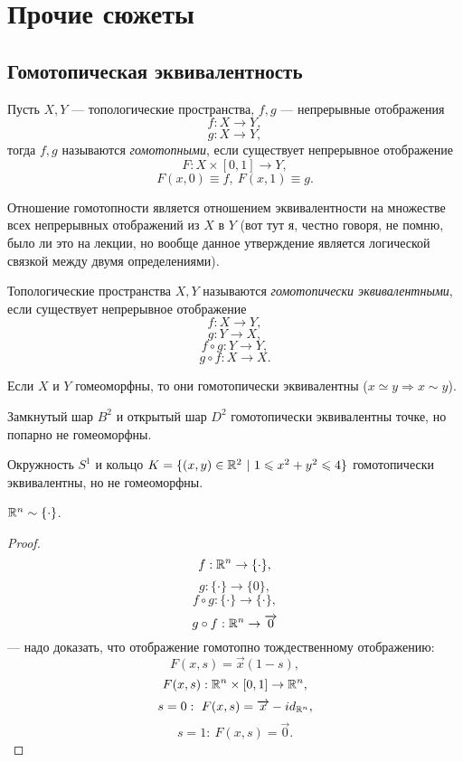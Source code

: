 \newpage
\section{Прочие сюжеты}
\subsection{Гомотопическая эквивалентность}
\begin{definition}
    Пусть $X,Y$ — топологические пространства, $f,g$ — непрерывные отображения
    \[f: X \to Y,\]
    \[g: X \to Y,\]
    тогда $f,g$ называются \textit{гомотопными}, если существует непрерывное отображение 
    \[F: X \times [0,1] \to Y,\]
    \[F(x,0) \equiv f, \ F(x,1) \equiv g.\]
\end{definition} 

\begin{remark}
    Отношение гомотопности является отношением эквивалентности на множестве всех непрерывных отображений из $X$ в $Y$ (вот тут я, честно говоря, не помню, было ли это на лекции, но вообще данное утверждение является логической связкой между двумя определениями).
\end{remark}

\begin{definition}
    Топологические пространства $X,Y$ называются \textit{гомотопически эквивалентными}, если существует непрерывное отображение 
    \[f: X \to Y,\]
    \[g: Y \to X,\]
    \[f \circ g: Y \to Y,\]
    \[g \circ f: X \to X.\]
\end{definition} 

\begin{statement}
    Если $X$ и $Y$ гомеоморфны, то они гомотопически эквивалентны ($x \simeq y \Longrightarrow x \sim y$).
\end{statement} 

\begin{example}
    Замкнутый шар $B^2$ и открытый шар $D^2$ гомотопически эквивалентны точке, но попарно не гомеоморфны.
\end{example}

\begin{example}
    Окружность $S^1$ и кольцо $K = \{(x,y) \in \mathbb{R}^2 \ | \ 1 \leqslant x^2 + y^2 \leqslant 4\}$ гомотопически эквивалентны, но не гомеоморфны.
\end{example}

\begin{statement}
    $\mathbb{R}^n \sim \{\cdot\}$.
\end{statement} 
\begin{proof}
    \[f: \mathbb{R}^n \to \{\cdot\},\]
    \[g: \{\cdot\} \to \{0\},\]
    \[f \circ g: \{\cdot\} \to \{\cdot\},\]
    \[g \circ f: \mathbb{R}^n \to \overrightarrow{0}\]
    — надо доказать, что отображение гомотопно тождественному отображению:
    \[F(x,s) = \overrightarrow{x}(1-s),\]
    \[F(x,s): \mathbb{R}^n \times [0,1] \to \mathbb{R}^n,\]
    \[s=0: \ F(x,s) = \overrightarrow{x} - id_{\mathbb{R}^n},\]
    \[s=1: \ F(x,s) = \overrightarrow{0}.\]
\end{proof} 

